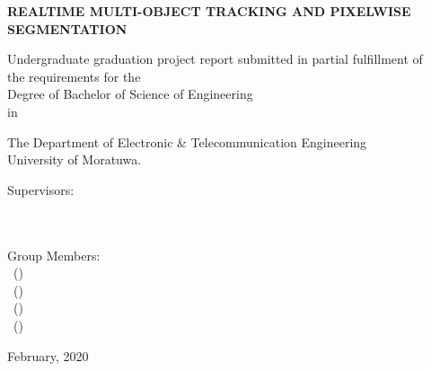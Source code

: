 \begin{titlepage}
  \vspace{1 in}
  \begin{center}
    \large{
    \MakeUppercase{\textbf{Realtime Multi-Object Tracking and Pixelwise Segmentation}}}\\
    \vspace{1.5 in}
    
    \normalsize
    Undergraduate graduation project report submitted in partial fulfillment of \\
    the requirements for the
\\
    Degree of Bachelor of Science of Engineering \\                                          
    in
\\
    
    \vspace{5mm}
    
    The Department of Electronic \& Telecommunication Engineering
 \\
    University of Moratuwa.
\\
    
    \vspace{50mm}
    
    \begin{flushleft}
    \begin{multicols}{2}
    	Supervisors: \\
    	\supervisorA \\
    	\supervisorB \\
    	\vfill\null
    	\columnbreak
    	
    	Group Members: \\
    	\memberA \ (\indexA) \\
    	\memberB \ (\indexB) \\
    	\memberC \ (\indexC) \\
    	\memberD \ (\indexD) \\
    	

    \end{multicols}
    \end{flushleft}
    
    
    \vspace{40mm}
    February, 2020\\

  \end{center}
\end{titlepage}

